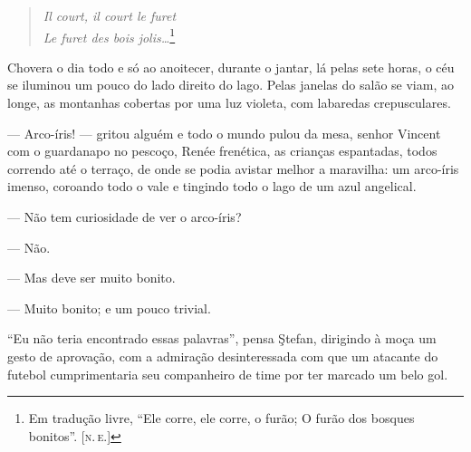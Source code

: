 \begin{verse}
\emph{Il court, il court le furet}\\
\emph{Le furet des bois jolis\ldots{}}\footnote{Em tradução livre, ``Ele corre, ele corre, o furão; O furão dos bosques bonitos''. \textsc{{[}n.\,e.{]}}}
\end{verse}


\asterisc

Chovera o dia todo e só ao anoitecer, durante o jantar, lá pelas sete
horas, o céu se iluminou um pouco do lado direito do lago. Pelas janelas
do salão se viam, ao longe, as montanhas cobertas por uma luz violeta,
com labaredas crepusculares.

--- Arco-íris! --- gritou alguém e todo o mundo pulou da mesa, senhor
Vincent com o guardanapo no pescoço, Renée frenética, as crianças
espantadas, todos correndo até o terraço, de onde se podia avistar
melhor a maravilha: um arco-íris imenso, coroando todo o vale e tingindo
todo o lago de um azul angelical.


--- Não tem curiosidade de ver o arco-íris?

--- Não.

--- Mas deve ser muito bonito.

--- Muito bonito; e um pouco trivial.

``Eu não teria encontrado essas palavras'', pensa Ştefan, dirigindo à
moça um gesto de aprovação, com a admiração desinteressada com que um
atacante do futebol cumprimentaria seu companheiro de time por ter
marcado um belo gol.

\asterisc


